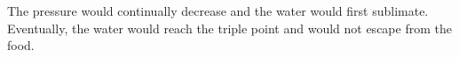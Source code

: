 The pressure would continually decrease and the water would first sublimate. Eventually, the water would reach the triple point and would not escape from the food.
